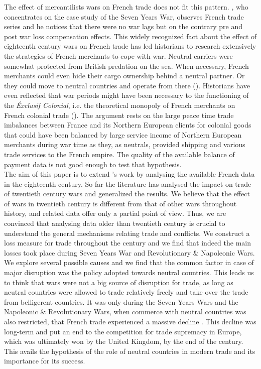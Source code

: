 \documentclass[12pt,a4paper,notitlepage,english]{article}
\begin{document}
The effect of mercantilists wars on French trade does not fit this pattern. \cite{riley_seven_1986}, who concentrates on the case study of the Seven Years War, observes French trade series and he notices that there were no war lags but on the contrary pre and post war loss compensation effects. This widely recognized fact about the effect of eighteenth century wars on French trade has led historians to research extensively the strategies of French merchants to cope with war. Neutral carriers were somewhat protected from British predation on the sea. When necessary, French merchants could even hide their cargo ownership behind a neutral partner. Or they could move to neutral countries and operate from there (\cite{marzagalli_was_2016}). Historians have even reflected that war periods might have been necessary to the functioning of the \textit{Éxclusif Colonial}, i.e. the theoretical monopoly of French merchants on French colonial trade (\cite{lespagnol_mondialisation_1997, morineau_vraie_1997, marzagalli_was_2016}). The argument rests on the large peace time trade imbalances between France and its Northern European clients for colonial goods that could have been balanced by large service income of Northern European merchants during war time as they, as neutrals, provided shipping and various trade services to the French empire. The quality of the available balance of payment data is not good enough to test that hypothesis.\\
The aim of this paper is to extend \cite{riley_seven_1986}’s work by analysing the available French data in the eighteenth century. So far the literature has analysed the impact on trade of twentieth century wars and generalized the results. We believe that the effect of wars in twentieth century is different from that of other wars throughout history, and related data offer only a partial point of view. Thus, we are convinced that analysing data older than twentieth century is crucial to understand the general mechanisms relating trade and conflicts. 
We construct a loss measure for trade throughout the century and we find that indeed the main losses took place during Seven Years War and Revolutionary \& Napoleonic Wars. We explore several possible causes and we find that the common factor in case of major disruption was the policy adopted towards neutral countries. This leads us to think that wars were not a big source of disruption for trade, as long as neutral countries were allowed to trade relatively freely and take over the trade from belligerent countries. It was only during the Seven Years Wars and the Napoleonic \& Revolutionary Wars, when commerce with neutral countries was also restricted, that French trade experienced a massive decline \citep{findlay2009power}. This decline was long-term and put an end to the competition for trade supremacy in Europe, which was ultimately won by the United Kingdom, by the end of the century. This avails the hypothesis of the role of neutral countries in modern trade and its importance for its success. \\
\end{document}
